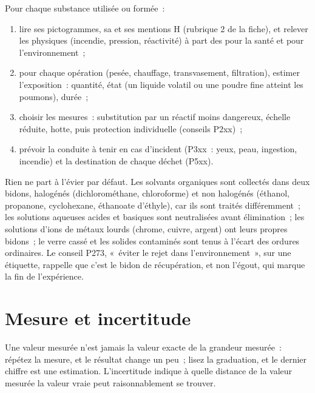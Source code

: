 \begin{method}\label{met:b1:lab-techniques-1:read-sds}
Pour chaque substance utilisée ou formée~:
\begin{enumerate}
  \item lire ses pictogrammes, sa  et ses mentions
        H (rubrique 2 de la fiche), et relever les  physiques
        (incendie, pression, réactivité) à part des  pour la santé
        et pour l'environnement~;
  \item pour chaque opération (pesée, chauffage, transvasement,
        filtration), estimer l'exposition~: quantité, état (un liquide
        volatil ou une poudre fine atteint les poumons), durée~;
  \item choisir les mesures~: substitution par un réactif moins
        dangereux, échelle réduite, hotte, puis protection individuelle
        (conseils P2xx)~;
  \item prévoir la conduite à tenir en cas d'incident (P3xx~: yeux, peau,
        ingestion, incendie) et la destination de chaque déchet (P5xx).
\end{enumerate}
\end{method}

\begin{inthelab}
Rien ne part à l'évier par défaut. Les solvants organiques sont collectés
dans deux bidons, halogénés (dichlorométhane, chloroforme) et non
halogénés (éthanol, propanone, cyclohexane, éthanoate d'éthyle), car ils
sont traités différemment~; les solutions aqueuses acides et basiques
sont neutralisées avant élimination~; les solutions d'ions de métaux
lourds (chrome, cuivre, argent) ont leurs propres bidons~; le verre
cassé et les solides contaminés sont tenus à l'écart des ordures
ordinaires. Le conseil P273, «~éviter le rejet dans
l'environnement~», sur une étiquette, rappelle que c'est le bidon de
récupération, et non l'égout, qui marque la fin de l'expérience.
\end{inthelab}

\section{Mesure et incertitude}

Une valeur mesurée n'est jamais la valeur exacte de la grandeur
mesurée~: répétez la mesure, et le résultat change un peu~; lisez la
graduation, et le dernier chiffre est une estimation. L'incertitude
indique à quelle distance de la valeur mesurée la valeur vraie peut
raisonnablement se trouver.

